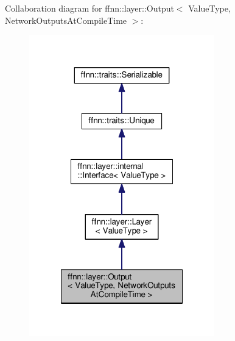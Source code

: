 Collaboration diagram for ffnn\-:\-:layer\-:\-:Output$<$ Value\-Type, Network\-Outputs\-At\-Compile\-Time $>$\-:\nopagebreak
\begin{figure}[H]
\begin{center}
\leavevmode
\includegraphics[width=228pt]{classffnn_1_1layer_1_1_output__coll__graph}
\end{center}
\end{figure}
